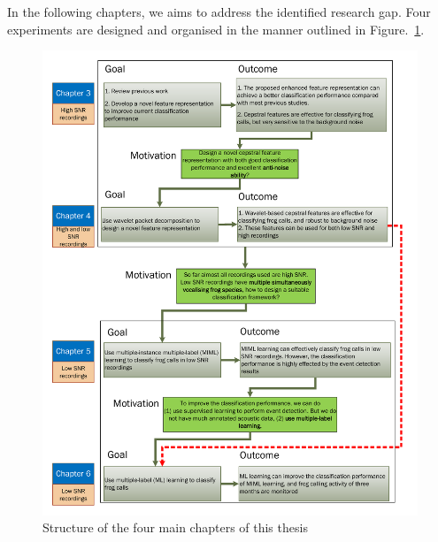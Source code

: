 In the following chapters, we aims to address the identified research gap. Four experiments are designed and organised in the manner outlined in Figure.~\ref{fig:mainchapters}.


\begin{figure}[htb!]
\centering
\includegraphics[width=\textwidth]{image/Ch1/structure_chapters.pdf}
\caption[Structure of the four main chapters of this thesis]{Structure of the four main chapters of this thesis}
\label{fig:mainchapters}
\end{figure}








